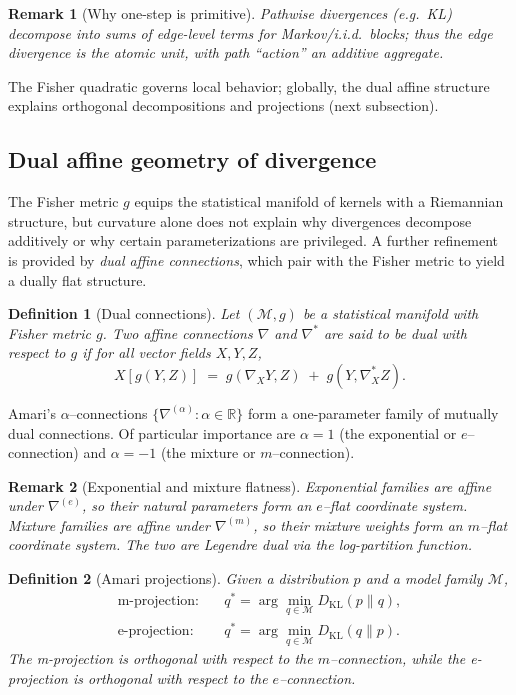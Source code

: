 \documentclass[11pt]{article}
\newtheorem{definition}{Definition}
\newtheorem{remark}{Remark}
\newcommand{\1}{\mathbf{1}}
\begin{document}
\begin{remark}[Why one-step is primitive]
Pathwise divergences (e.g.\ KL) decompose into sums of edge-level terms for Markov/i.i.d.\ blocks; thus the edge divergence is the atomic unit, with path ``action'' an additive aggregate.
\end{remark}

The Fisher quadratic governs local behavior; globally, the dual affine structure explains orthogonal decompositions and projections (next subsection).

\subsection{Dual affine geometry of divergence}

The Fisher metric $g$ equips the statistical manifold of kernels with a Riemannian structure,
but curvature alone does not explain why divergences decompose additively or why certain
parameterizations are privileged. A further refinement is provided by \emph{dual affine
connections}, which pair with the Fisher metric to yield a dually flat structure.

\begin{definition}[Dual connections]
Let $(\mathcal M,g)$ be a statistical manifold with Fisher metric $g$.
Two affine connections $\nabla$ and $\nabla^\ast$ are said to be \emph{dual} with respect
to $g$ if for all vector fields $X,Y,Z$,
\[
X[g(Y,Z)] \;=\; g(\nabla_X Y,Z) \;+\; g(Y,\nabla^\ast_X Z).
\]
\end{definition}

Amari's $\alpha$--connections $\{\nabla^{(\alpha)} : \alpha\in\mathbb R\}$ form
a one-parameter family of mutually dual connections. Of particular importance are
$\alpha=1$ (the exponential or $e$--connection) and $\alpha=-1$ (the mixture or $m$--connection).

\begin{remark}[Exponential and mixture flatness]
Exponential families are affine under $\nabla^{(e)}$, so their natural parameters form an
$e$--flat coordinate system. Mixture families are affine under $\nabla^{(m)}$, so their
mixture weights form an $m$--flat coordinate system. The two are Legendre dual via the
log-partition function.
\end{remark}

\begin{definition}[Amari projections]
Given a distribution $p$ and a model family $\mathcal M$,
\begin{align*}
\text{m-projection:} & \quad q^\ast = \arg\min_{q\in\mathcal M} D_{\mathrm{KL}}(p\|q), \\
\text{e-projection:} & \quad q^\ast = \arg\min_{q\in\mathcal M} D_{\mathrm{KL}}(q\|p).
\end{align*}
The m-projection is orthogonal with respect to the $m$--connection,
while the e-projection is orthogonal with respect to the $e$--connection.
\end{definition}
\end{document}
